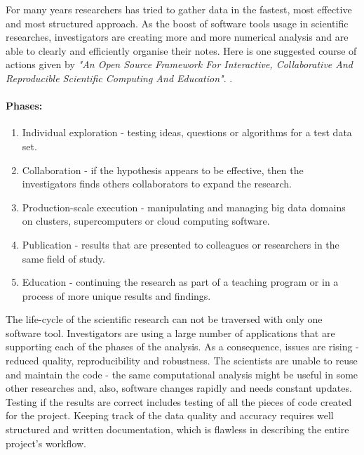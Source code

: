 For many years researchers has tried to gather data in the fastest, most effective and most structured approach. As the boost of software tools usage in scientific researches, investigators are creating more and more numerical analysis and are able to clearly and efficiently organise their notes. Here is one suggested course of actions given by \textit{"An Open Source Framework For Interactive, Collaborative And Reproducible Scientific Computing And Education"}. \cite{perez2013open}.

\paragraph{Phases:}\cite{perez2013open}
\begin{enumerate}
\item Individual exploration - testing ideas, questions or algorithms for a test data set.

\item Collaboration - if the hypothesis appears to be effective, then the investigators finds others collaborators to expand the research.

\item Production-scale execution - manipulating and managing big data domains on clusters, supercomputers or cloud computing software.

\item Publication - results that are presented to colleagues or researchers in the same field of study.

\item Education - continuing the research as part of a teaching program or in a process of more unique results and findings.
 
\end{enumerate}

The life-cycle of the scientific research can not be traversed with only one software tool. Investigators are using a large number of applications that are supporting each of the phases of the analysis. As a consequence, issues are rising - reduced quality, reproducibility and robustness. The scientists are unable to reuse and maintain the code - the same computational analysis might be useful in some other researches and, also, software changes rapidly and needs constant updates. Testing if the results are correct includes testing of all the pieces of code created for the project. Keeping track of the data quality and accuracy requires well structured and written documentation, which is flawless in describing the entire project's workflow. 

